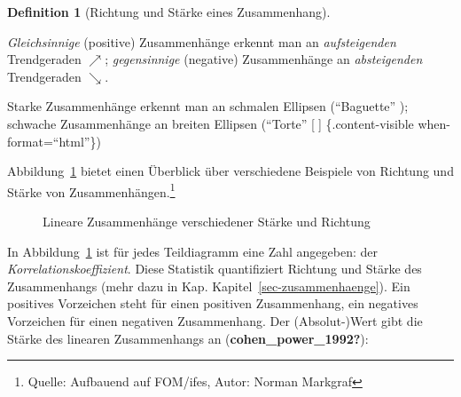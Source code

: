 \documentclass[
  a4paper,
  DIV=11]{scrreprt}
\theoremstyle{definition}
\theoremstyle{definition}
\theoremstyle{definition}
\newtheorem{definition}{Definition}[chapter]
\theoremstyle{remark}
\begin{document}
\begin{definition}[Richtung und Stärke eines
Zusammenhang]\protect\hypertarget{def-zshg}{}\label{def-zshg}

\emph{Gleichsinnige} (positive) Zusammenhänge erkennt man an
\emph{aufsteigenden} Trendgeraden \(\nearrow\); \emph{gegensinnige}
(negative) Zusammenhänge an \emph{absteigenden} Trendgeraden
\(\searrow\).

Starke Zusammenhänge erkennt man an schmalen Ellipsen (``Baguette'' );
schwache Zusammenhänge an breiten Ellipsen (``Torte'' {[}🥮{]}
\{.content-visible when-format=``html''\})

Abbildung~\ref{fig-cors} bietet einen Überblick über verschiedene
Beispiele von Richtung und Stärke von Zusammenhängen.\footnote{Quelle:
  Aufbauend auf FOM/ifes, Autor: Norman Markgraf}

\begin{figure}


\caption{\label{fig-cors}Lineare Zusammenhänge verschiedener Stärke und
Richtung}

\end{figure}%

In Abbildung~\ref{fig-cors} ist für jedes Teildiagramm eine Zahl
angegeben: der \emph{Korrelationskoeffizient}. Diese Statistik
quantifiziert Richtung und Stärke des Zusammenhangs (mehr dazu in Kap.
Kapitel~\ref{sec-zusammenhaenge}). Ein positives Vorzeichen steht für
einen positiven Zusammenhang, ein negatives Vorzeichen für einen
negativen Zusammenhang. Der (Absolut-)Wert gibt die Stärke des linearen
Zusammenhangs an (\textbf{cohen\_power\_1992?}):


\end{definition}
\end{document}
